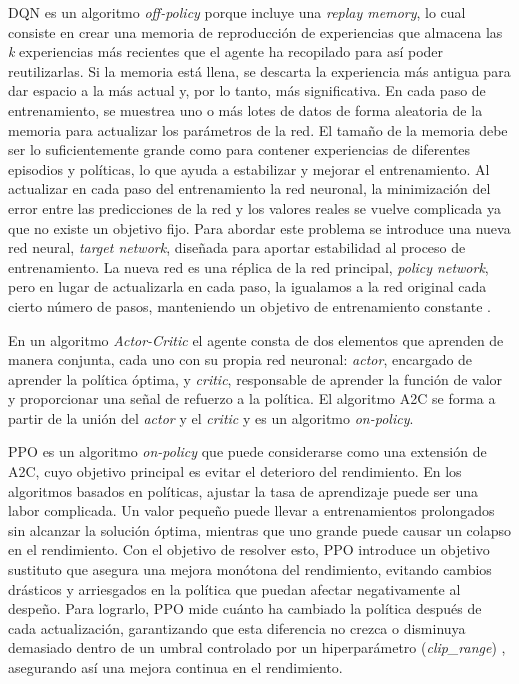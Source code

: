 \ac{DQN} es un algoritmo \textit{off-policy} porque incluye una \textit{replay memory}, lo cual consiste en crear una memoria de reproducción de experiencias que almacena las \textit{k} experiencias más recientes que el agente ha recopilado para así poder reutilizarlas. Si la memoria está llena, se descarta la experiencia más antigua para dar espacio a la más actual y, por lo tanto, más significativa. En cada paso de entrenamiento, se muestrea uno o más lotes de datos de forma aleatoria de la memoria para actualizar los parámetros de la red. El tamaño de la memoria debe ser lo suficientemente grande como para contener experiencias de diferentes episodios y políticas, lo que ayuda a estabilizar y mejorar el entrenamiento. Al actualizar en cada paso del entrenamiento la red neuronal, la minimización del error entre las predicciones de la red y los valores reales se vuelve complicada ya que no existe un objetivo fijo. Para abordar este problema se introduce una nueva red neural, \textit{target network}, diseñada para aportar estabilidad al proceso de entrenamiento. La nueva red es una réplica de la red principal, \textit{policy network}, pero en lugar de actualizarla en cada paso, la igualamos a la red original cada cierto número de pasos, manteniendo un objetivo de entrenamiento constante \cite{drl}.

En un algoritmo \textit{Actor-Critic} el agente consta de dos elementos que aprenden de manera conjunta, cada uno con su propia red neuronal: \textit{actor}, encargado de aprender la política óptima, y \textit{critic}, responsable de aprender la función de valor y proporcionar una señal de refuerzo a la política. El algoritmo \ac{A2C} se forma a partir de la unión del \textit{actor} y el \textit{critic} y es un algoritmo \textit{on-policy}. 

\ac{PPO} es un algoritmo \textit{on-policy} que puede considerarse como una extensión de \ac{A2C}, cuyo objetivo principal es evitar el deterioro del rendimiento. En los algoritmos basados en políticas, ajustar la tasa de aprendizaje puede ser una labor complicada. Un valor pequeño puede llevar a entrenamientos prolongados sin alcanzar la solución óptima, mientras que uno grande puede causar un colapso en el rendimiento. Con el objetivo de resolver esto, \ac{PPO} introduce un objetivo sustituto que asegura una mejora monótona del rendimiento, evitando cambios drásticos y arriesgados en la política que puedan afectar negativamente al despeño. Para lograrlo, \ac{PPO} mide cuánto ha cambiado la política después de cada actualización, garantizando que esta diferencia no crezca o disminuya demasiado dentro de un umbral controlado por un hiperparámetro (\textit{clip\_range}) \cite{drl}, asegurando así una mejora continua en el rendimiento. 

